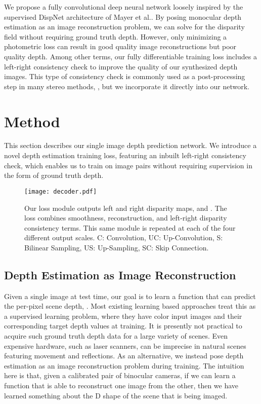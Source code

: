 \documentclass[10pt,twocolumn,letterpaper]{article}
\makeatletter
\newcommand*{\ea}{et al.\@\xspace}
\makeatother
\begin{document}
We propose a fully convolutional deep neural network loosely inspired by the supervised DispNet architecture of Mayer \ea\cite{mayer2015large}. 
By posing monocular depth estimation as an image reconstruction problem, we can solve for the disparity field without requiring ground truth depth. 
However, only minimizing a photometric loss can result in good quality image reconstructions but poor quality depth.
Among other terms, our fully differentiable training loss includes a left-right consistency check to improve the quality of our synthesized depth images. 
This type of consistency check is commonly used as a post-processing step in many stereo methods, \eg \cite{vzbontar2016stereo}, but we incorporate it directly into our network. 


\section{Method}
This section describes our single image depth prediction network.
We introduce a novel depth estimation training loss, featuring an inbuilt left-right consistency check, which enables us to train on image pairs without requiring supervision in the form of ground truth depth. 

\begin{figure}
  \centering
  \texttt{[image: decoder.pdf]}
  \caption{Our loss module outputs left and right disparity maps,  and . The loss combines smoothness, reconstruction, and left-right disparity consistency terms. This same module is repeated at each of the four different output scales. C: Convolution, UC: Up-Convolution, S: Bilinear Sampling, US: Up-Sampling, SC: Skip Connection. \vspace{-5pt}}
  \label{fig:pipeline}
\end{figure}



\subsection{Depth Estimation as Image Reconstruction}
Given a single image  at test time, our goal is to learn a function  that can predict the per-pixel scene depth, . 
Most existing learning based approaches treat this as a supervised learning problem, where they have color input images and their corresponding target depth values at training.
It is presently not practical to acquire such ground truth depth data for a large variety of scenes. Even expensive hardware, such as laser scanners, can be imprecise in natural scenes featuring movement and reflections.
As an alternative, we instead pose depth estimation as an image reconstruction problem during training.
The intuition here is that, given a calibrated pair of binocular cameras, if we can learn a function that is able to reconstruct one image from the other, then we have learned something about the D shape of the scene that is being imaged.
\end{document}
